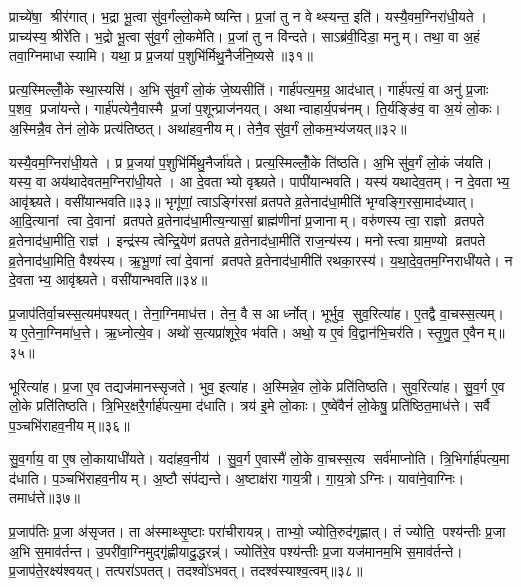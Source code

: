 प्राच्ये॑षा॒ श्रीर॑गात्। भ॒द्रा भू॒त्वा सु॑व॒र्गंल्लो॒कमेष्यन्ति। प्र॒जां तु न वेथ्स्यन्त॒ इति॑। यस्यै॒वम॒ग्निरा॑धी॒यते। प्राच्य॑स्य॒ श्रीरे॑ति। भ॒द्रो भू॒त्वा सु॑व॒र्गं लो॒कमे॑ति। प्र॒जां तु न वि॑न्दते। साऽब्र॑वी॒दिडा॒ मनुम्। तथा॒ वा अ॒हं तवा॒ग्निमाधास्यामि। यथा॒ प्र प्र॒जया॑ प॒शुभि॑र्मिथु॒नैर्ज॑नि॒ष्यसे॥३१॥

प्रत्य॒स्मिल्लोँ॒के स्था॒स्यसि॑। अ॒भि सु॑व॒र्गं लो॒कं जे॒ष्यसीति॑। गार्\mbox{}ह॑पत्य॒मग्र॒ आद॑धात्। गार्\mbox{}ह॑पत्यं॒ वा अनु॑ प्र॒जाः प॒शव॒ प्रजा॑यन्ते। गार्\mbox{}ह॑पत्येनै॒वास्मै प्र॒जां प॒शून्प्राज॑नयत्। अथान्वाहार्य॒पच॑नम्। ति॒र्यङ्ङि॑व॒ वा अ॒यं लो॒कः। अ॒स्मिन्नै॒व तेन॑ लो॒के प्रत्य॑तिष्ठत्। अथा॑हव॒नीयम्। तेनै॒व सु॑व॒र्गं लो॒कम॒भ्य॑जयत्॥३२॥

यस्यै॒वम॒ग्निरा॑धी॒यते। प्र प्र॒जया॑ प॒शुभि॑र्मिथु॒नैर्जा॑यते। प्रत्य॒स्मिल्लोँ॒के ति॑ष्ठति। अ॒भि सु॑व॒र्गं लो॒कं ज॑यति। यस्य॒ वा अय॑थादेवतम॒ग्निरा॑धी॒यते। आ दे॒वताभ्यो वृश्च्यते। पापी॑यान्भवति। यस्य॑ यथादेव॒तम्। न दे॒वताभ्य॒ आवृ॑श्च्यते। वसी॑यान्भवति॥३३॥ भृगू॑णां॒ त्वाऽङ्गि॑रसां व्रतपते व्र॒तेनाद॑धा॒मीति॑ भृग्वङ्गि॒रसा॒माद॑ध्यात्। आ॒दि॒त्यानां त्वा दे॒वानां व्रतपते व्र॒तेनाद॑धा॒मीत्य॒न्यासां॒ ब्राह्म॑णीनां प्र॒जानाम्। वरु॑णस्य त्वा॒ राज्ञो व्रतपते व्र॒तेनाद॑धा॒मीति॒ राज्ञ॑। इन्द्र॑स्य त्वेन्द्रि॒येण॑ व्रतपते व्र॒तेनाद॑धा॒मीति॑ राज॒न्य॑स्य। मनोस्त्वा ग्राम॒ण्यो व्रतपते व्र॒तेनाद॑धा॒मिति॒ वैश्य॑स्य। ऋ॒भू॒णां त्वा॑ दे॒वानां व्रतपते व्र॒तेनाद॑धा॒मीति॑ रथका॒रस्य॑। य॒था॒दे॒व॒तम॒ग्निराधी॑यते। न दे॒वताभ्य॒ आवृ॑श्च्यते। वसी॑यान्भवति॥३४॥

प्र॒जाप॑तिर्वा॒चस्स॒त्यम॑पश्यत्। तेना॒ग्निमाध॑त्त। तेन॒ वै स आर्ध्नोत्। भूर्भुव॒ सुव॒रित्या॑ह। ए॒तद्वै वा॒चस्स॒त्यम्। य ए॒तेना॒ग्निमा॑ध॒त्ते। ऋ॒ध्नोत्ये॒व। अथो॑ स॒त्यप्रा॑शूरे॒व भ॑वति। अथो॒ य ए॒वं वि॒द्वान॑भि॒चर॑ति। स्तृ॒णु॒त ए॒वैनम्॥३५॥

भूरित्या॑ह। प्र॒जा ए॒व तद्यज॑मानस्सृजते। भुव॒ इत्या॑ह। अ॒स्मिन्ने॒व लो॒के प्रति॑तिष्ठति। सुव॒रित्या॑ह। सु॒व॒र्ग ए॒व लो॒के प्रति॑तिष्ठति। त्रि॒भिर॒क्षरै॒र्गार्\mbox{}ह॑पत्य॒मा द॑धाति। त्रय॑ इ॒मे लो॒काः। ए॒ष्वे॑वैनं॑ लो॒केषु॒ प्रति॑ष्ठित॒माध॑त्ते। सर्वै प॒ञ्चभि॑राहव॒नीयम्॥३६॥

सु॒व॒र्गाय॒ वा ए॒ष लो॒कायाधी॑यते। यदा॑हव॒नीय॑। सु॒व॒र्ग ए॒वास्मै॑ लो॒के वा॒चस्स॒त्य सर्व॑माप्नोति। त्रि॒भिर्गार्\mbox{}ह॑पत्य॒मा द॑धाति। प॒ञ्चभि॑राहव॒नीयम्। अ॒ष्टौ संप॑द्यन्ते। अ॒ष्टाक्ष॑रा गाय॒त्री। गा॒य॒त्रोऽग्निः। यावा॑ने॒वाग्निः। तमाध॑त्ते॥३७॥

प्र॒जाप॑तिः प्र॒जा अ॑सृजत। ता अ॑स्माथ्सृ॒ष्टाः परा॑चीरायन्न्। ताभ्यो॒ ज्योति॒रुद॑गृह्णात्। तं ज्योति॒ पश्य॑न्तीः प्र॒जा अ॒भि स॒माव॑र्तन्त। उ॒परी॑वा॒ग्निमुद्गृ॑ह्णीयादु॒द्धरन्न्॑। ज्योति॑रे॒व पश्य॑न्तीः प्र॒जा यज॑मानम॒भि स॒माव॑र्तन्ते। प्र॒जाप॑ते॒रक्ष्य॑श्वयत्। तत्परा॑ऽपतत्। तदश्वो॑ऽभवत्। तदश्व॑स्याश्व॒त्वम्॥३८॥

